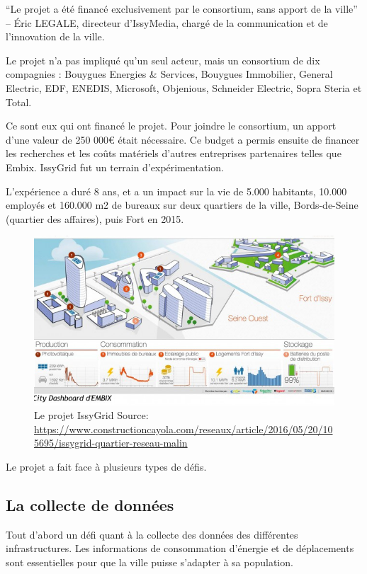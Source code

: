 ``Le projet a été financé exclusivement par le consortium, sans apport de la ville''
--  Éric LEGALE, directeur d’IssyMedia, chargé de la communication et
de l’innovation de la ville.

Le projet n'a pas impliqué qu'un seul acteur, mais un consortium de dix compagnies :
Bouygues Energies \& Services, Bouygues Immobilier, General Electric, EDF, ENEDIS, Microsoft,
Objenious, Schneider Electric, Sopra Steria et Total.

Ce sont eux qui ont financé le projet.
Pour joindre le consortium, un apport d'une valeur de 250 000€ était nécessaire.
Ce budget a permis ensuite de financer les recherches et les coûts matériels d'autres entreprises partenaires telles que Embix.
IssyGrid fut un terrain d'expérimentation.

L'expérience a duré 8 ans, et a un impact sur la vie de 5.000 habitants, 10.000 employés
et 160.000 m2 de bureaux sur deux quartiers de la ville, Bords-de-Seine (quartier des affaires),
puis Fort en 2015.

\begin{figure}[h]
    \centering
    \includegraphics[scale=0.70]{media/issygrid.jpg}
    \caption{Le projet IssyGrid\newline
        \tiny{Source:
          \url{https://www.constructioncayola.com/reseaux/article/2016/05/20/105695/issygrid-quartier-reseau-malin}
        }
    }
    \label{fig:terre_rare}
  \end{figure}


Le projet a fait face à plusieurs types de défis.

\subsection{La collecte de données}
Tout d'abord un défi quant à la collecte des données des différentes infrastructures.
Les informations de consommation d'énergie et de déplacements sont essentielles pour que la ville
puisse s'adapter à sa population.

